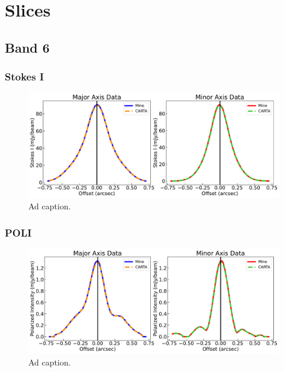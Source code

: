 \chapter{Slices}
\label{ch3}

\section{Band 6}
\subsection{Stokes I}
\begin{figure}[h]
  \centering
  \includegraphics[width=2\textwidth]{WRITEUP_AND_IMAGES/IMAGES/IRS63_StokesI_slice_BAND6.pdf}
  \caption{Ad caption.}
  \label{fig: }
\end{figure}


\subsection{POLI}
\begin{figure}[h]
  \centering
  \includegraphics[width=2\textwidth]{WRITEUP_AND_IMAGES/IMAGES/IRS63_POLI_slice_BAND6.pdf}
  \caption{Ad caption.}
  \label{fig: }
\end{figure}


